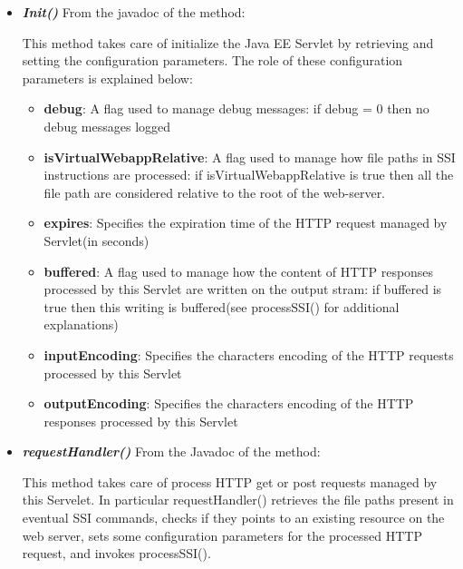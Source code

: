 \documentclass[11pt,titlepage]{article} %
\begin{document}
  \begin{itemize}
    \item \textbf{\textit{Init()}}
      \newline From the javadoc of the method:
      
      This method takes care of initialize the Java EE Servlet by retrieving and setting the configuration
      parameters.\newline
      The role of these configuration parameters is explained below:
      \begin{itemize}
       \item \textbf{debug}:
	A flag used to manage debug messages: if debug = 0 then no debug messages logged
       \item \textbf{isVirtualWebappRelative}:
	A flag used to manage how file paths in SSI instructions are processed: if isVirtualWebappRelative is true then all the file path are
	considered relative to the root of the web-server.
       \item \textbf{expires}:
	Specifies the expiration time of the HTTP request managed by Servlet(in seconds)
       \item \textbf{buffered}:
	A flag used to manage how the content of HTTP responses processed by this Servlet are written on the output stram:
	if buffered is true then this writing is buffered(see processSSI() for additional explanations)
       \item \textbf{inputEncoding}:
	Specifies the characters encoding of the HTTP requests processed by this Servlet
       \item \textbf{outputEncoding}:
	Specifies the characters encoding of the HTTP responses processed by this Servlet
      \end{itemize}

      

    \item \textbf{\textit{requestHandler()}}
      \newlines From the Javadoc of the method:
      
      
      
      This method takes care of process HTTP get or post requests managed by this Servelet. In particular 
      requestHandler() retrieves the file paths present in eventual SSI commands, checks if they points to an
      existing resource on the web server, sets some configuration parameters for the processed HTTP request, and 
      invokes processSSI().\newline
      

\end{itemize}
\end{document}
